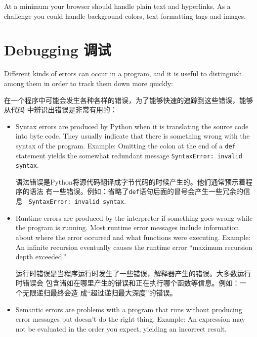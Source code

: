 \documentclass[10pt]{book}
\begin{document}
\begin{CJK}{UTF8}{gbsn}
\begin{exercise}
At a minimum your browser should handle plain text and hyperlinks.  As
a challenge you could handle background colors, text
formatting tags and images.


\end{exercise}



\appendix

\chapter{Debugging 调试}


Different kinds of errors can occur
in a program, and it is useful to distinguish among them
in order to track them down more quickly:

在一个程序中可能会发生各种各样的错误，为了能够快速的追踪到这些错误，能够从代码
中辨识出错误是非常有用的：

\begin{itemize}

\item Syntax errors are produced by Python when it is translating the
  source code into byte code.  They usually indicate that there is
  something wrong with the syntax of the program.  Example: Omitting
  the colon at the end of a {\tt def} statement yields the somewhat
  redundant message {\tt SyntaxError: invalid syntax}.

  语法错误是Python将源代码翻译成字节代码的时候产生的。他们通常预示着程序的语法
  有一些错误。例如：省略了{\tt def}语句后面的冒号会产生一些冗余的信息 {\tt
  SyntaxError: invalid syntax}.

\item Runtime errors are produced by the interpreter if something goes
  wrong while the program is running.  Most runtime error messages
  include information about where the error occurred and what
  functions were executing.  Example: An infinite recursion eventually
  causes the runtime error ``maximum recursion depth exceeded.''

  运行时错误是当程序运行时发生了一些错误，解释器产生的错误。大多数运行时错误会
  包含诸如在哪里产生的错误和正在执行哪个函数等信息。例如：一个无限递归最终会造
  成``超过递归最大深度''的错误。

\item Semantic errors are problems with a program that runs without
  producing error messages but doesn't do the right thing.  Example:
  An expression may not be evaluated in the order you expect, yielding
  an incorrect result.


\end{itemize}
\end{CJK}
\end{document}
